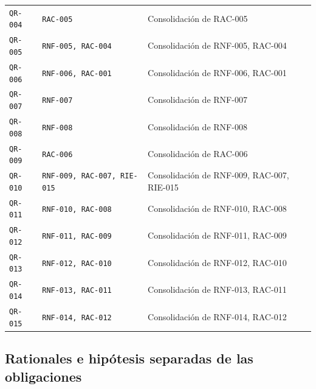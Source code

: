 \documentclass[10pt,letterpaper]{article}
\begin{document}
\begin{landscape}
\begin{longtable}{P{2.7cm}P{2.6cm}P{15.7cm}}
\texttt{QR-004} & \texttt{RAC-005} & Consolidación de RAC-005\\
\texttt{QR-005} & \texttt{RNF-005, RAC-004} & Consolidación de RNF-005, RAC-004\\
\texttt{QR-006} & \texttt{RNF-006, RAC-001} & Consolidación de RNF-006, RAC-001\\
\texttt{QR-007} & \texttt{RNF-007} & Consolidación de RNF-007\\
\texttt{QR-008} & \texttt{RNF-008} & Consolidación de RNF-008\\
\texttt{QR-009} & \texttt{RAC-006} & Consolidación de RAC-006\\
\texttt{QR-010} & \texttt{RNF-009, RAC-007, RIE-015} & Consolidación de RNF-009, RAC-007, RIE-015\\
\texttt{QR-011} & \texttt{RNF-010, RAC-008} & Consolidación de RNF-010, RAC-008\\
\texttt{QR-012} & \texttt{RNF-011, RAC-009} & Consolidación de RNF-011, RAC-009\\
\texttt{QR-013} & \texttt{RNF-012, RAC-010} & Consolidación de RNF-012, RAC-010\\
\texttt{QR-014} & \texttt{RNF-013, RAC-011} & Consolidación de RNF-013, RAC-011\\
\texttt{QR-015} & \texttt{RNF-014, RAC-012} & Consolidación de RNF-014, RAC-012\\
\bottomrule
\end{longtable}
\end{landscape}

\subsection{Rationales e hipótesis separadas de las obligaciones}
\end{document}
